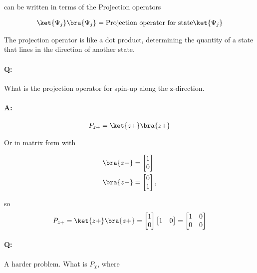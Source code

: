 can be written in terms of the Projection operators

\begin{align*}
\ket{\Psi_j} \bra{\Psi_j} = \text{Projection operator for state} \ket{\Psi_j}
\end{align*}

The projection operator is like a dot product, determining the quantity of a state that lines in the direction of another state.

\paragraph{Q:} What is the projection operator for spin-up along the z-direction.
\paragraph{A:}

\begin{align}\label{eqn:PHY356HNov2:100}
P_{z+} = \ket{z+}\bra{z+}
\end{align}

Or in matrix form with

\begin{align}\label{eqn:PHY356HNov2:105}
\bra{z+} &=
\begin{bmatrix}
1 \\
0
\end{bmatrix} \\
\bra{z-} &=
\begin{bmatrix}
0 \\
1
\end{bmatrix},
\end{align}

so
\begin{align}\label{eqn:PHY356HNov2:110}
P_{z+} = \ket{z+}\bra{z+} =
\begin{bmatrix}
1 \\
0
\end{bmatrix}
\begin{bmatrix}
1 & 0
\end{bmatrix}
=
\begin{bmatrix}
1 & 0 \\
0 & 0
\end{bmatrix}
\end{align}

\paragraph{Q:} A harder problem.  What is $P_\chi$, where

